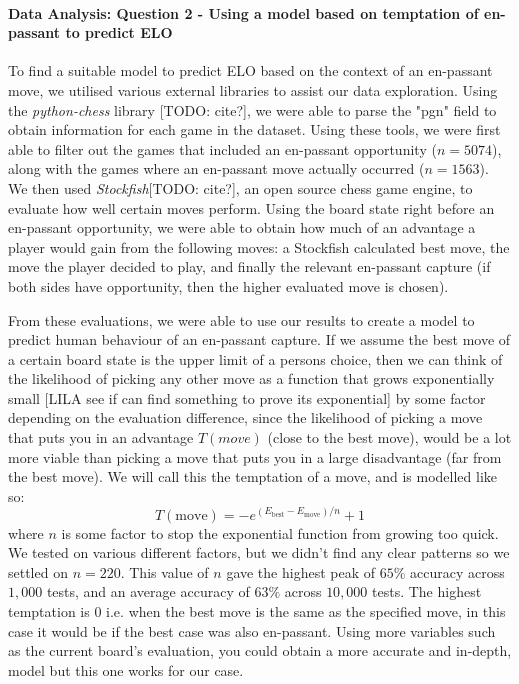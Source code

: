 \documentclass[10pt,a4paper,twocolumn]{article}
\begin{document}
\paragraph{Data Analysis: Question 2 - Using a model based on temptation of en-passant to predict ELO}
To find a suitable model to predict ELO based on the context of an en-passant move, we utilised various external libraries to assist our data exploration. Using the \textit{python-chess} library [TODO: cite?], we were able to parse the "pgn" field to obtain information for each game in the dataset. Using these tools, we were first able to filter out the games that included an en-passant opportunity ($n=5074$), along with the games where an en-passant move actually occurred ($n=1563$). We then used \textit{Stockfish}[TODO: cite?], an open source chess game engine, to evaluate how well certain moves perform. Using the board state right before an en-passant opportunity, we were able to obtain how much of an advantage a player would gain from the following moves: a Stockfish calculated best move, the move the player decided to play, and finally the relevant en-passant capture (if both sides have opportunity, then the higher evaluated move is chosen).\newline

From these evaluations, we were able to use our results to create a model to predict human behaviour of an en-passant capture. If we assume the best move of a certain board state is the upper limit of a persons choice, then we can think of the likelihood of picking any other move as a function that grows exponentially small [LILA see if can find something to prove its exponential] by some factor depending on the evaluation difference, since the likelihood of picking a move that puts you in an advantage $T(move)$ (close to the best move), would be a lot more viable than picking a move that puts you in a large disadvantage (far from the best move). We will call this the temptation of a move, and is modelled like so:
$$T(\text{move})= -e^{(E_{\text{best}} - E_{\text{move}})/{n}} + 1$$
where $n$ is some factor to stop the exponential function from growing too quick. We tested on various different factors, but we didn't find any clear patterns so we settled on $n=220$. This value of $n$ gave the highest peak of $65\%$ accuracy across $1,000$ tests, and an average accuracy of $63\%$ across $10,000$ tests. The highest temptation is $0$ i.e. when the best move is the same as the specified move, in this case it would be if the best case was also en-passant. Using more variables such as the current board's evaluation, you could obtain a more accurate and in-depth, model but this one works for our case. \newline
\end{document}
